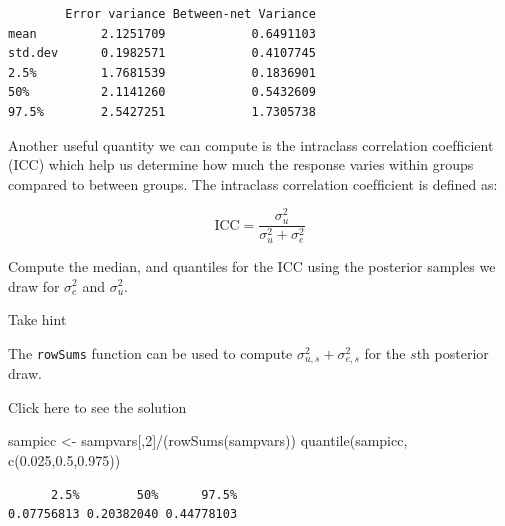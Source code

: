 \documentclass[
  letterpaper,
  DIV=11,
  numbers=noendperiod]{scrartcl}
\newenvironment{Shaded}{\begin{snugshade}}{\end{snugshade}}
\newcommand{\DecValTok}[1]{\textcolor[rgb]{0.68,0.00,0.00}{#1}}
\newcommand{\FloatTok}[1]{\textcolor[rgb]{0.68,0.00,0.00}{#1}}
\newcommand{\FunctionTok}[1]{\textcolor[rgb]{0.28,0.35,0.67}{#1}}
\newcommand{\NormalTok}[1]{\textcolor[rgb]{0.00,0.23,0.31}{#1}}
\newcommand{\OtherTok}[1]{\textcolor[rgb]{0.00,0.23,0.31}{#1}}
\newcommand{\SpecialCharTok}[1]{\textcolor[rgb]{0.37,0.37,0.37}{#1}}
\begin{document}
\begin{verbatim}
        Error variance Between-net Variance
mean         2.1251709            0.6491103
std.dev      0.1982571            0.4107745
2.5%         1.7681539            0.1836901
50%          2.1141260            0.5432609
97.5%        2.5427251            1.7305738
\end{verbatim}

\begin{tcolorbox}[enhanced jigsaw, title={Task}, titlerule=0mm, bottomrule=.15mm, coltitle=black, opacityback=0, toprule=.15mm, colbacktitle=quarto-callout-warning-color!10!white, bottomtitle=1mm, colback=white, breakable, rightrule=.15mm, opacitybacktitle=0.6, arc=.35mm, toptitle=1mm, leftrule=.75mm, left=2mm, colframe=quarto-callout-warning-color-frame]

Another useful quantity we can compute is the intraclass correlation
coefﬁcient (ICC) which help us determine how much the response varies
within groups compared to between groups. The intraclass correlation
coefﬁcient is defined as:

\[
\text{ICC} = \frac{\sigma^2_u}{\sigma^2_u + \sigma^2_e}
\]

Compute the median, and quantiles for the ICC using the posterior
samples we draw for \(\sigma^2_e\) and \(\sigma^2_u\).

Take hint

The \texttt{rowSums} function can be used to compute
\(\sigma^2_{u,s} + \sigma^2_{e,s}\) for the \(s\)th posterior draw.

Click here to see the solution

\begin{Shaded}
\begin{Highlighting}[]
\NormalTok{sampicc }\OtherTok{\textless{}{-}}\NormalTok{ sampvars[,}\DecValTok{2}\NormalTok{]}\SpecialCharTok{/}\NormalTok{(}\FunctionTok{rowSums}\NormalTok{(sampvars))}
\FunctionTok{quantile}\NormalTok{(sampicc, }\FunctionTok{c}\NormalTok{(}\FloatTok{0.025}\NormalTok{,}\FloatTok{0.5}\NormalTok{,}\FloatTok{0.975}\NormalTok{))}
\end{Highlighting}
\end{Shaded}

\begin{verbatim}
      2.5%        50%      97.5% 
0.07756813 0.20382040 0.44778103 
\end{verbatim}

\end{tcolorbox}
\end{document}
